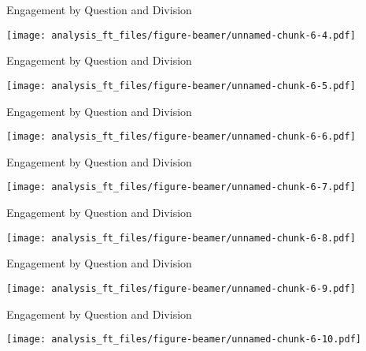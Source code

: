 \documentclass[handout]{beamer}
\begin{document}
\begin{frame}{Engagement by Question and Division}
\protect\hypertarget{engagement-by-question-and-division-3}{}

\texttt{[image: analysis\_ft\_files/figure-beamer/unnamed-chunk-6-4.pdf]}

\end{frame}

\begin{frame}{Engagement by Question and Division}
\protect\hypertarget{engagement-by-question-and-division-4}{}

\texttt{[image: analysis\_ft\_files/figure-beamer/unnamed-chunk-6-5.pdf]}

\end{frame}

\begin{frame}{Engagement by Question and Division}
\protect\hypertarget{engagement-by-question-and-division-5}{}

\texttt{[image: analysis\_ft\_files/figure-beamer/unnamed-chunk-6-6.pdf]}

\end{frame}

\begin{frame}{Engagement by Question and Division}
\protect\hypertarget{engagement-by-question-and-division-6}{}

\texttt{[image: analysis\_ft\_files/figure-beamer/unnamed-chunk-6-7.pdf]}

\end{frame}

\begin{frame}{Engagement by Question and Division}
\protect\hypertarget{engagement-by-question-and-division-7}{}

\texttt{[image: analysis\_ft\_files/figure-beamer/unnamed-chunk-6-8.pdf]}

\end{frame}

\begin{frame}{Engagement by Question and Division}
\protect\hypertarget{engagement-by-question-and-division-8}{}

\texttt{[image: analysis\_ft\_files/figure-beamer/unnamed-chunk-6-9.pdf]}

\end{frame}

\begin{frame}{Engagement by Question and Division}
\protect\hypertarget{engagement-by-question-and-division-9}{}

\texttt{[image: analysis\_ft\_files/figure-beamer/unnamed-chunk-6-10.pdf]}

\end{frame}
\end{document}
